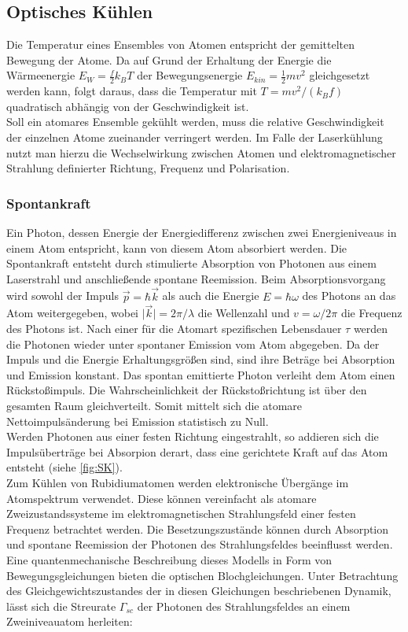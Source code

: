 \documentclass[
class=book,
accentcolor=1b,
custommargins=geometry,
fontsize=11pt,
thesis={type=Versuchsanleitung},
ruledheaders=all,
headline=false,
instbox=false,
marginpar=false,
title=small,
ignore-missing-data=true,
twoside=false,
pdfa=false %
]{apqpub}
\begin{document}
				\subsection{Optisches Kühlen}
				
				Die Temperatur eines Ensembles von Atomen entspricht der gemittelten Bewegung der Atome. Da auf Grund der
				Erhaltung der Energie die Wärmeenergie $E_W = \frac{f}{2}k_BT$ der Bewegungsenergie $E_{kin} = \frac{1}{2}mv^2$ gleichgesetzt werden kann, folgt daraus, dass die Temperatur mit $T = mv^2/(k_Bf)$ quadratisch abhängig von der Geschwindigkeit ist.\\ 
				Soll ein atomares Ensemble gekühlt werden, muss die relative Geschwindigkeit der einzelnen Atome zueinander
				verringert werden. Im Falle der Laserkühlung nutzt man hierzu die Wechselwirkung zwischen Atomen und
				elektromagnetischer Strahlung definierter Richtung, Frequenz und Polarisation.
				
				\subsubsection{Spontankraft}\label{ssec:SK}
				
				Ein Photon, dessen Energie der Energiedifferenz zwischen zwei Energieniveaus in einem Atom entspricht, kann von diesem Atom absorbiert werden. Die Spontankraft entsteht durch stimulierte Absorption von Photonen aus einem Laserstrahl und anschließende spontane Reemission. Beim Absorptionsvorgang wird sowohl der Impuls $\vec{p} = \hbar \vec{k}$ als auch die Energie $E = \hbar \omega$ des Photons an das Atom weitergegeben, wobei $\vert \vec{k} \vert = 2\pi/\lambda$ die Wellenzahl und $v = \omega/2\pi$ die Frequenz des Photons ist. Nach einer für die Atomart spezifischen Lebensdauer $\tau$ werden die Photonen
				wieder unter spontaner Emission vom Atom abgegeben. Da der Impuls und die Energie Erhaltungsgrößen sind,
				sind ihre Beträge bei Absorption und Emission konstant. Das spontan emittierte Photon verleiht dem Atom einen Rückstoßimpuls. Die Wahrscheinlichkeit der Rückstoßrichtung ist über den gesamten Raum gleichverteilt. Somit mittelt sich die atomare Nettoimpulsänderung bei Emission statistisch zu Null.\\ Werden Photonen aus einer festen Richtung eingestrahlt, so addieren sich die Impulsüberträge bei Absorpion derart, dass eine gerichtete Kraft auf das Atom entsteht (siehe \autoref{fig:SK}).\\
				Zum Kühlen von Rubidiumatomen werden elektronische Übergänge im Atomspektrum verwendet. Diese können
				vereinfacht als atomare Zweizustandssysteme im elektromagnetischen Strahlungsfeld einer festen Frequenz
				betrachtet werden. Die Besetzungszustände können durch Absorption und spontane Reemission der Photonen des
				Strahlungsfeldes beeinflusst werden. Eine quantenmechanische Beschreibung dieses Modells in Form von Bewegungsgleichungen bieten die optischen Blochgleichungen. Unter Betrachtung des Gleichgewichtszustandes der in diesen Gleichungen beschriebenen Dynamik, lässt sich die Streurate $\varGamma_{sc}$ der Photonen des Strahlungsfeldes an einem Zweiniveauatom herleiten:
				
\end{document}

